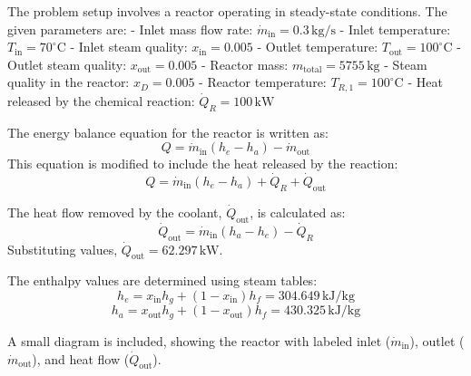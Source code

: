 The problem setup involves a reactor operating in steady-state conditions. The given parameters are:  
- Inlet mass flow rate: \( \dot{m}_{\text{in}} = 0.3 \, \text{kg/s} \)  
- Inlet temperature: \( T_{\text{in}} = 70^\circ\text{C} \)  
- Inlet steam quality: \( x_{\text{in}} = 0.005 \)  
- Outlet temperature: \( T_{\text{out}} = 100^\circ\text{C} \)  
- Outlet steam quality: \( x_{\text{out}} = 0.005 \)  
- Reactor mass: \( m_{\text{total}} = 5755 \, \text{kg} \)  
- Steam quality in the reactor: \( x_D = 0.005 \)  
- Reactor temperature: \( T_{R,1} = 100^\circ\text{C} \)  
- Heat released by the chemical reaction: \( \dot{Q}_R = 100 \, \text{kW} \)  

The energy balance equation for the reactor is written as:  
\[
Q = \dot{m}_{\text{in}} (h_e - h_a) - \dot{m}_{\text{out}}
\]  
This equation is modified to include the heat released by the reaction:  
\[
Q = \dot{m}_{\text{in}} (h_e - h_a) + \dot{Q}_R + \dot{Q}_{\text{out}}
\]  

The heat flow removed by the coolant, \( \dot{Q}_{\text{out}} \), is calculated as:  
\[
\dot{Q}_{\text{out}} = \dot{m}_{\text{in}} (h_a - h_e) - \dot{Q}_R  
\]  
Substituting values, \( \dot{Q}_{\text{out}} = 62.297 \, \text{kW} \).  

The enthalpy values are determined using steam tables:  
\[
h_e = x_{\text{in}} h_g + (1 - x_{\text{in}}) h_f = 304.649 \, \text{kJ/kg}  
\]  
\[
h_a = x_{\text{out}} h_g + (1 - x_{\text{out}}) h_f = 430.325 \, \text{kJ/kg}  
\]  

A small diagram is included, showing the reactor with labeled inlet (\( \dot{m}_{\text{in}} \)), outlet (\( \dot{m}_{\text{out}} \)), and heat flow (\( \dot{Q}_{\text{out}} \)).
